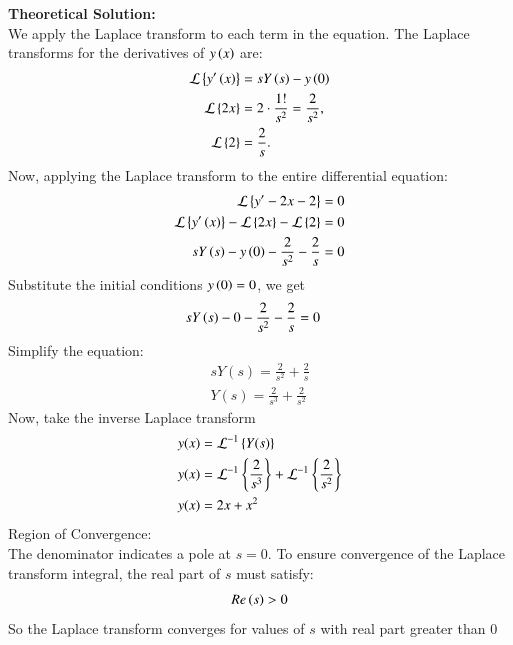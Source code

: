\documentclass[journal]{IEEEtran}
\begin{document}
\textbf{Theoretical Solution:}\\
We apply the Laplace transform to each term in the equation. The Laplace transforms for the derivatives of $y\left(x\right)$ are:
\begin{align}
\mathcal{L}\left\{y^{\prime}\left(x\right)\right\} &= sY\left(s\right) - y\left(0\right) \\
\mathcal{L}\left\{2x\right\} &= 2 \cdot \frac{1!}{s^2} = \frac{2}{s^2}, \\
\mathcal{L}\left\{2\right\} &= \frac{2}{s}.
\end{align}
Now, applying the Laplace transform to the entire differential equation:
\begin{align}
\mathcal{L}\left\{y^{\prime}-2x-2\right\} &= 0\\
\mathcal{L}\left\{y^{\prime}\left(x\right)\right\} - \mathcal{L}\left\{2x\right\} - \mathcal{L}\left\{2\right\} &= 0 \\
sY\left(s\right) - y\left(0\right) - \frac{2}{s^2} - \frac{2}{s} &= 0
\end{align}
Substitute the initial conditions $y\left(0\right) = 0$, we get
\begin{align}
sY\left(s\right) - 0 - \frac{2}{s^2} - \frac{2}{s} &= 0
\end{align}
Simplify the equation:
\begin{align}
    sY(s) =  \frac{2}{s^2} + \frac{2}{s}\\
    Y(s) =  \frac{2}{s^3} + \frac{2}{s^2}
\end{align}
Now, take the inverse Laplace transform \\
\begin{align}
y(x) &= \mathcal{L}^{-1}\left\{Y(s)\right\}\\
y(x) &=   \mathcal{L}^{-1}\left\{\frac{2}{s^3}\right\} + \mathcal{L}^{-1}\left\{\frac{2}{s^2}\right\}\\
y(x) &=  2x + x^2
\end{align}
Region of Convergence:\\
The denominator indicates a pole at $s= 0 $. To ensure convergence of the Laplace transform integral, the real part of $s$ must satisfy:
\begin{align}
    Re\left(s\right)>0
\end{align}
So the Laplace transform converges for values of $s$ with real part greater than 0\\
\end{document}
